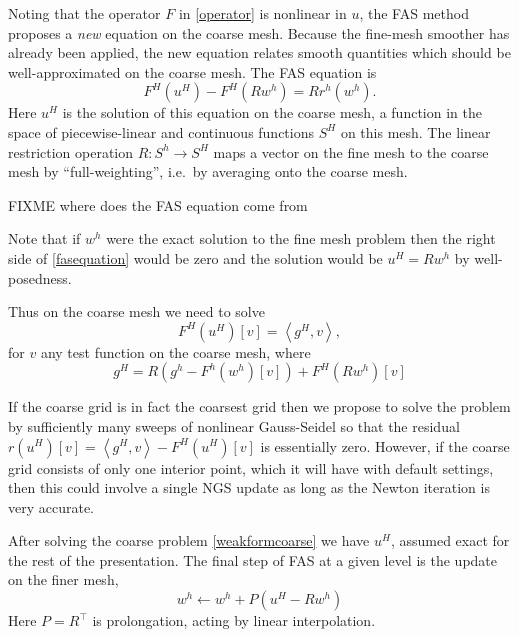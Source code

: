 \documentclass[letterpaper,final,12pt,reqno]{amsart}
\newcommand{\ip}[2]{\left<#1,#2\right>}
\begin{document}
Noting that the operator $F$ in \eqref{operator} is nonlinear in $u$, the FAS method  proposes a \emph{new} equation on the coarse mesh.  Because the fine-mesh smoother has already been applied, the new equation relates smooth quantities which should be well-approximated on the coarse mesh.  The FAS equation is
\begin{equation}
  F^H(u^H) - F^H(R w^h) = R r^h(w^h). \label{fasequation}
\end{equation}
Here $u^H$ is the solution of this equation on the coarse mesh, a function in the space of piecewise-linear and continuous functions $S^H$ on this mesh.  The linear restriction operation $R:S^h \to S^H$ maps a vector on the fine mesh to the coarse mesh by ``full-weighting'', i.e.~by averaging onto the coarse mesh.

FIXME where does the FAS equation come from

Note that if $w^h$ were the exact solution to the fine mesh problem then the right side of \eqref{fasequation} would be zero and the solution would be $u^H = R w^h$ by well-posedness.

Thus on the coarse mesh we need to solve
\begin{equation}
  F^H(u^H)[v] = \ip{g^H}{v},  \label{weakformcoarse}
\end{equation}
for $v$ any test function on the coarse mesh, where
  $$g^H = R (g^h - F^h(w^h)[v]) + F^H(R w^h)[v]$$

If the coarse grid is in fact the coarsest grid then we propose to solve the problem by sufficiently many sweeps of nonlinear Gauss-Seidel so that the residual $r(u^H)[v] = \ip{g^H}{v} - F^H(u^H)[v]$ is essentially zero.  However, if the coarse grid consists of only one interior point, which it will have with default settings, then this could involve a single NGS update as long as the Newton iteration is very accurate.

After solving the coarse problem \eqref{weakformcoarse} we have $u^H$, assumed exact for the rest of the presentation.  The final step of FAS at a given level is the update on the finer mesh,
\begin{equation}
  w^h \longleftarrow w^h + P(u^H - R w^h) \label{fasupdate}
\end{equation}
Here $P=R^\top$ is prolongation, acting by linear interpolation.

\small

\bigskip


\end{document}
